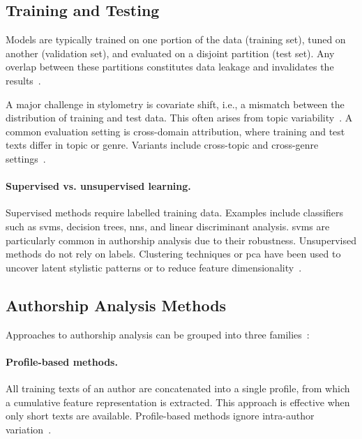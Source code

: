\subsection{Training and Testing}

Models are typically trained on one portion of the data (training set), tuned on another (validation set), and evaluated on a disjoint partition (test set). 
Any overlap between these partitions constitutes data leakage and invalidates the results~\citep{bischoff_importance_2020,altakrori_topic_2021,boenninghoff_o2d2_2021}. 

A major challenge in stylometry is covariate shift, i.e., a mismatch between the distribution of training and test data. 
This often arises from topic variability~\citep{boenninghoff_o2d2_2021}. 
A common evaluation setting is cross-domain attribution, where training and test texts differ in topic or genre.
Variants include cross-topic and cross-genre settings~\citep{barlas_cross_domain_2020}.  


\paragraph{Supervised vs. unsupervised learning.}  
Supervised methods require labelled training data. 
Examples include classifiers such as \acp{svm}, decision trees, \acp{nn}, and linear discriminant analysis. 
\acp{svm} are particularly common in authorship analysis due to their robustness. 
Unsupervised methods do not rely on labels.
Clustering techniques or \ac{pca} have been used to uncover latent stylistic patterns or to reduce feature dimensionality~\citep{abbasi_writeprints_2008}.


\subsection{Authorship Analysis Methods}
\label{subsec:attribution_methods}

Approaches to authorship analysis can be grouped into three families~\citep{stamatatos_survey_2009}:

\paragraph{Profile-based methods.} 
All training texts of an author are concatenated into a single profile, from which a cumulative feature representation is extracted. 
This approach is effective when only short texts are available.
Profile-based methods ignore intra-author variation~\citep{stamatatos_survey_2009,elmanarelbouanani_authorship_2014,neal_surveying_2018}.  


